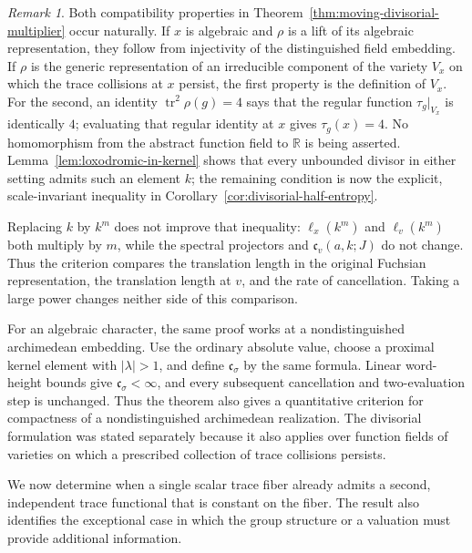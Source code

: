 \documentclass[11pt,reqno]{amsart}
\theoremstyle{definition}
\theoremstyle{remark}
\newtheorem{remark}[theorem]{Remark}
\newcommand{\R}{\mathbb R}
\newcommand{\Tr}{\operatorname{tr}}
\begin{document}
\begin{remark}
Both compatibility properties in
Theorem~\ref{thm:moving-divisorial-multiplier} occur naturally.  If \(x\)
is algebraic and \(\rho\) is a lift of its algebraic representation, they
follow from injectivity of the distinguished field embedding.  If
\(\rho\) is the generic representation of an irreducible component of
the variety \(V_x\) on which the trace collisions at \(x\) persist, the first property is the
definition of \(V_x\).  For the second, an identity
\(\Tr^2\rho(g)=4\) says that the regular function
\(\tau_g|_{V_x}\) is identically \(4\); evaluating that regular identity
at \(x\) gives \(\tau_g(x)=4\).  No homomorphism from the abstract
function field to \(\R\) is being asserted.
Lemma~\ref{lem:loxodromic-in-kernel} shows that every unbounded
divisor in either setting admits such an element \(k\); the remaining
condition is now the explicit, scale-invariant inequality in
Corollary~\ref{cor:divisorial-half-entropy}.

Replacing \(k\) by \(k^m\) does not improve that inequality:
\(\ell_x(k^m)\) and \(\ell_v(k^m)\) both multiply by \(m\), while the
spectral projectors and \(\mathfrak c_v(a,k;J)\) do not change.  Thus the
criterion compares the translation length in the original Fuchsian
representation, the translation length at \(v\), and the rate of
cancellation.  Taking a large power changes neither side of this comparison.

For an algebraic character, the same proof works at a nondistinguished
archimedean embedding.  Use the ordinary absolute value, choose a proximal
kernel element with \(|\lambda|>1\), and define
\(\mathfrak c_\sigma\) by the same formula.  Linear word-height bounds give
\(\mathfrak c_\sigma<\infty\), and every subsequent cancellation and
two-evaluation step is unchanged.  Thus the theorem also gives a
quantitative criterion for compactness of a nondistinguished archimedean realization.
The divisorial formulation was stated separately because it also applies
over function fields of varieties on which a prescribed collection of
trace collisions persists.
\end{remark}

We now determine when a single scalar trace fiber already admits a second,
independent trace functional that is constant on the fiber.  The result also
identifies the exceptional case in which the group structure or a valuation
must provide additional information.
\end{document}
